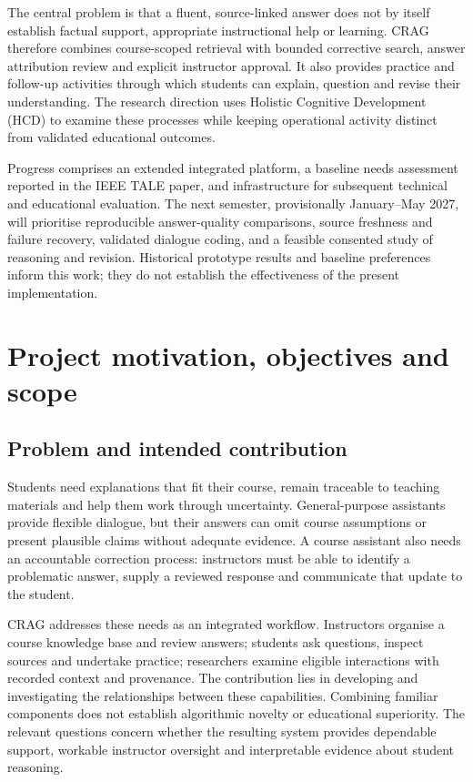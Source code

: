 \documentclass[11pt,a4paper]{article}
\begin{document}
The central problem is that a fluent, source-linked answer does not by itself establish factual support, appropriate instructional help or learning. CRAG therefore combines course-scoped retrieval with bounded corrective search, answer attribution review and explicit instructor approval. It also provides practice and follow-up activities through which students can explain, question and revise their understanding. The research direction uses Holistic Cognitive Development (HCD) to examine these processes while keeping operational activity distinct from validated educational outcomes.

Progress comprises an extended integrated platform, a baseline needs assessment reported in the IEEE TALE paper, and infrastructure for subsequent technical and educational evaluation. The next semester, provisionally January--May 2027, will prioritise reproducible answer-quality comparisons, source freshness and failure recovery, validated dialogue coding, and a feasible consented study of reasoning and revision. Historical prototype results and baseline preferences inform this work; they do not establish the effectiveness of the present implementation.

\begingroup
\small
\setlength{\parskip}{0pt}
\tableofcontents
\endgroup
\clearpage

\section{Project motivation, objectives and scope}
\subsection{Problem and intended contribution}
Students need explanations that fit their course, remain traceable to teaching materials and help them work through uncertainty. General-purpose assistants provide flexible dialogue, but their answers can omit course assumptions or present plausible claims without adequate evidence. A course assistant also needs an accountable correction process: instructors must be able to identify a problematic answer, supply a reviewed response and communicate that update to the student.

CRAG addresses these needs as an integrated workflow. Instructors organise a course knowledge base and review answers; students ask questions, inspect sources and undertake practice; researchers examine eligible interactions with recorded context and provenance. The contribution lies in developing and investigating the relationships between these capabilities. Combining familiar components does not establish algorithmic novelty or educational superiority. The relevant questions concern whether the resulting system provides dependable support, workable instructor oversight and interpretable evidence about student reasoning.
\end{document}
